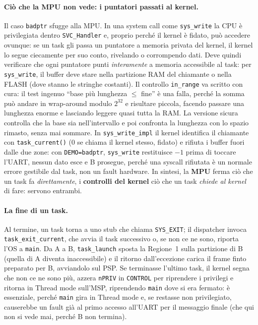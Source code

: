 \paragraph*{Ciò che la MPU non vede: i puntatori passati al kernel.}
Il caso \texttt{badptr} sfugge alla MPU. In una system call come \texttt{sys\_write} la CPU è
privilegiata dentro \texttt{SVC\_Handler} e, proprio perché il kernel è fidato, può accedere
ovunque: se un task gli passa un puntatore a memoria privata del kernel, il kernel lo segue
ciecamente per suo conto, rivelando o corrompendo dati. Deve quindi verificare che ogni
puntatore punti \emph{interamente} a memoria accessibile al task: per \texttt{sys\_write}, il
buffer deve stare nella partizione RAM del chiamante o nella FLASH (dove stanno le stringhe
costanti). Il controllo \texttt{in\_range} va scritto con cura: il test ingenuo ``base più
lunghezza $\le$ fine'' è una falla, perché la somma può andare in wrap-around modulo $2^{32}$ e
risultare piccola, facendo passare una lunghezza enorme e lasciando leggere quasi tutta la RAM.
La versione sicura controlla che la base sia nell'intervallo e poi confronta la lunghezza con lo
spazio rimasto, senza mai sommare. In \texttt{sys\_write\_impl} il kernel identifica il
chiamante con \texttt{task\_current()} (0 se chiama il kernel stesso, fidato) e rifiuta i buffer
fuori dalle due zone: con \texttt{DEMO=badptr}, \texttt{sys\_write} restituisce $-1$ prima di
toccare l'UART, nessun dato esce e B prosegue, perché una syscall rifiutata è un normale errore
gestibile dal task, non un fault hardware. In sintesi, la \textbf{MPU} ferma ciò che un task fa
\emph{direttamente}, i \textbf{controlli del kernel} ciò che un task \emph{chiede al kernel} di
fare: servono entrambi.

\paragraph*{La fine di un task.}
Al termine, un task torna a uno stub che chiama \texttt{SYS\_EXIT}; il dispatcher invoca
\texttt{task\_exit\_current}, che avvia il task successivo o, se non ce ne sono, riporta l'OS a
\texttt{main}. Da A a B, \texttt{task\_launch} sposta la Regione~1 sulla partizione di B (quella
di A diventa inaccessibile) e il ritorno dall'eccezione carica il frame finto preparato per B,
avviandolo sul PSP. Se terminasse l'ultimo task, il kernel segna che non ce ne sono più, azzera
\texttt{nPRIV} in \texttt{CONTROL} per riprendere i privilegi e ritorna in Thread mode sull'MSP,
riprendendo \texttt{main} dove si era fermato: è essenziale, perché \texttt{main} gira in Thread
mode e, se restasse non privilegiato, causerebbe un fault già al primo accesso all'UART per il
messaggio finale (che qui non si vede mai, perché B non termina).

